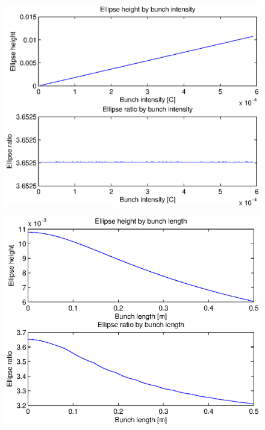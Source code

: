 \begin{figure}[tbh]
\includegraphics{figures/beam_deflection_script_03_elipse_height}
\centering
\caption{}
\label{fig:beam_deflection_script_03_elipse_height}
\end{figure}

\begin{figure}[tbh]
\includegraphics{figures/beam_deflection_script_04_elipse_height_by_bunch_intensity}
\centering
\caption{}
\label{fig:beam_deflection_script_04_elipse_height_by_bunch_intensity}
\end{figure}

